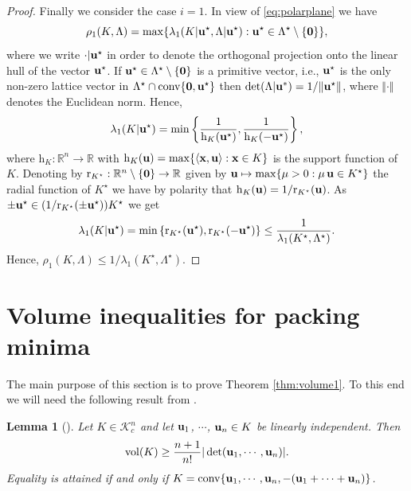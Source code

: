 \documentclass{amsart}
\newtheorem{lemma}[theorem]{Lemma}
\theoremstyle{definition}
\theoremstyle{remark}
\numberwithin{equation}{section}
\begin{document}
\begin{proof}
Finally we consider the case $i=1$. In view of \eqref{eq:polarplane} we have 
\begin{equation*}
 \rho_1(K,\Lambda) =\max\{\lambda_1(K|{\bf u}^\star, \Lambda|{\bf u}^\star): {\bf u}^\star\in \Lambda^\star\setminus\{\bf 0\}\}, 
\end{equation*}
where we write $\cdot|{\bf u}^\star$ in order to denote the orthogonal projection onto the linear hull of the vector ${\bf u}^\star$.  If ${\bf u}^\star\in \Lambda^\star\setminus\{\bf 0\}$ is a primitive vector, i.e.,  ${\bf u}^\star$ is the only non-zero lattice vector in $\Lambda^\star\cap{\rm conv}\{{\bf 0},{\bf u}^\star\}$ then $\det(\Lambda|{\bf u}^*)=1/\Vert{\bf u}^\star\Vert$, where $\Vert\cdot\Vert$ denotes the Euclidean norm. Hence, 
\begin{equation*}
    \lambda_1(K|{\bf u}^\star)= \min\left\{\frac{1}{\mathrm{h}_K({\bf u}^\star)},\frac{1}{\mathrm{h}_K(-{\bf u}^\star)}\right\},
\end{equation*}
where $\mathrm{h}_K:\mathbb{R}^n\to \mathbb{R}$ with $\mathrm{h}_K({\bf u}) =\max\{\langle{\bf x}, {\bf u}\rangle: {\bf x}\in K\}$ is the support function of $K$. Denoting by $\mathrm{r}_{K^\star}:\mathbb{R}^n\setminus\{{\bf 0}\}\to \mathbb{R}$ given by ${\bf u}\mapsto \max\{\mu>0: \mu\,{\bf u} \in K^\star\}$ the radial function of $K^\star$ we have by polarity that $\mathrm{h}_K({\bf u})=1/\mathrm{r}_{K^\star}({\bf u})$. As $\pm {\bf u}^\star\in (1/\mathrm{r}_{K^\star}(\pm {\bf u}^\star))K^\star$ we get 
\begin{equation*}
    \lambda_1(K|{\bf u}^\star )= \min\left\{\mathrm{r}_{K^\star}({\bf u}^\star),\mathrm{r}_{K^\star}(-{\bf u}^\star)\right\} \leq \frac{1}{\lambda_1(K^\star,\Lambda^\star)}.
    \end{equation*}
Hence, $\rho_1(K,\Lambda)\leq 1/\lambda_1(K^\star,\Lambda^\star)$.    
\end{proof}




\section{\bf Volume inequalities for packing minima}\label{section:volume_inequality}


The main purpose of this section is to prove Theorem \ref{thm:volume1}. To this end we will need the following result from \cite{hhh2016}.

\begin{lemma}[]\label{hhh2016}
Let $K\in\mathcal{K}_c^n$ and let ${\bf u}_1$, $\cdots$, ${\bf u}_n\in K$ be linearly independent. Then
$$\mathrm{vol}(K)\ge\frac{n+1}{n!}|\det({\bf u}_1,\cdots,{\bf u}_n)|.$$ Equality is attained if and only if $K=\mathrm{conv}\{{\bf u}_1,\cdots,{\bf u}_n,-({\bf u}_1+\cdots+{\bf u}_n)\}$. 
\end{lemma}
\end{document}
